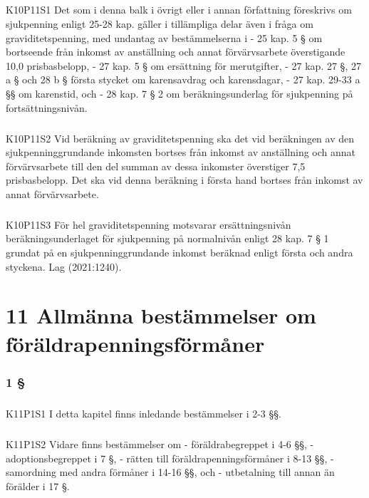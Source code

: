 \documentclass[a4paper,notitlepage,openany,10pt]{book}
\begin{document}
\paragraph*{}
{\tiny K10P11S1}
Det som i denna balk i övrigt eller i annan författning föreskrivs om sjukpenning enligt 25-28 kap. gäller i tillämpliga delar även i fråga om graviditetspenning, med undantag av bestämmelserna i
\newline - 25 kap. 5 § om bortseende från inkomst av anställning och annat förvärvsarbete överstigande 10,0 prisbasbelopp,
\newline - 27 kap. 5 § om ersättning för merutgifter,
\newline - 27 kap. 27 §, 27 a § och 28 b § första stycket om karensavdrag och karensdagar,
\newline - 27 kap. 29-33 a §§ om karenstid, och
\newline - 28 kap. 7 § 2 om beräkningsunderlag för sjukpenning på fortsättningsnivån.
\paragraph*{}
{\tiny K10P11S2}
Vid beräkning av graviditetspenning ska det vid beräkningen av den sjukpenninggrundande inkomsten bortses från inkomst av anställning och annat förvärvsarbete till den del summan av dessa inkomster överstiger 7,5 prisbasbelopp. Det ska vid denna beräkning i första hand bortses från inkomst av annat förvärvsarbete.
\paragraph*{}
{\tiny K10P11S3}
För hel graviditetspenning motsvarar ersättningsnivån beräkningsunderlaget för sjukpenning på normalnivån enligt 28 kap. 7 § 1 grundat på en sjukpenninggrundande inkomst beräknad enligt första och andra styckena.
Lag (2021:1240).
\chapter*{11 Allmänna bestämmelser om föräldrapenningsförmåner}
\subsection*{1 §}
\paragraph*{}
{\tiny K11P1S1}
I detta kapitel finns inledande bestämmelser i 2-3 §§.
\paragraph*{}
{\tiny K11P1S2}
Vidare finns bestämmelser om
\newline - föräldrabegreppet i 4-6 §§,
\newline - adoptionsbegreppet i 7 §,
\newline - rätten till föräldrapenningsförmåner i 8-13 §§,
\newline - samordning med andra förmåner i 14-16 §§, och
\newline - utbetalning till annan än förälder i 17 §.
\end{document}
